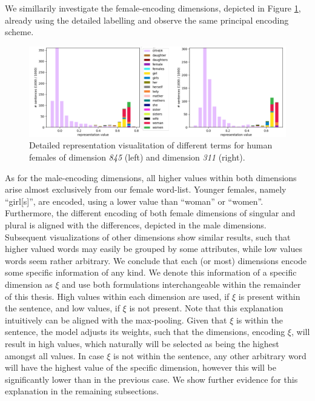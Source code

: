 \noindent
We simillarily investigate the female-encoding dimensions, depicted in Figure \ref{fig:mf_detailed_f}, already using the detailed labelling and observe the same principal encoding scheme. 
\begin{figure}[tph!]
\centering
	\includegraphics[totalheight=5cm]{fig/mf_detailed_f.png}
	\caption{Detailed representation visualitation of different terms for human females of dimension \textit{845} (left) and dimension \textit{311} (right).}
	\label{fig:mf_detailed_f}
\end{figure}
As for the male-encoding dimensions, all higher values within both dimensions arise almost exclusively from our female word-list. Younger females, namely ``girl[s]'', are encoded, using a lower value than ``woman'' or ``women''. Furthermore, the different encoding of both female dimensions of singular and plural is aligned with the differences, depicted in the male dimensions. Subsequent visualizations of other dimensions show similar results, such that higher valued words may easily be grouped by some attributes, while low values words seem rather arbitrary. We conclude that each (or most) dimensions encode some specific information of any kind. We denote this information of a specific dimension as $\xi$ and use both formulations interchangeable within the remainder of this thesis. High values within each dimension are used, if $\xi$ is present within the sentence, and low values, if $\xi$ is not present. Note that this explanation intuitively can be aligned with the max-pooling. Given that $\xi$ is within the sentence, the model adjusts its weights, such that the dimensions, encoding $\xi$, will result in high values, which naturally will be selected as being the highest amongst all values. In case $\xi$ is not within the sentence, any other arbitrary word will have the highest value of the specific dimension, however this will be significantly lower than in the previous case. We show further evidence for this explanation in the remaining subsections.

